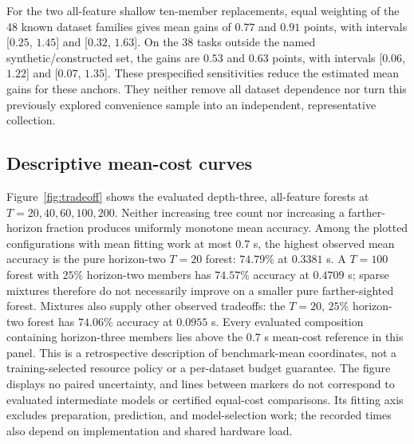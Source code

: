 For the two all-feature shallow ten-member replacements, equal weighting
of the 48 known dataset families gives mean gains of $0.77$ and $0.91$
points, with intervals [$0.25$, $1.45$] and [$0.32$, $1.63$]. On the
38 tasks outside the named synthetic/constructed set, the gains are
$0.53$ and $0.63$ points, with intervals [$0.06$, $1.22$] and
[$0.07$, $1.35$]. These prespecified sensitivities reduce the estimated
mean gains for these anchors. They neither remove all dataset dependence
nor turn this previously explored convenience sample into an independent,
representative collection.

\subsection{Descriptive mean-cost curves}
Figure~\ref{fig:tradeoff} shows the evaluated depth-three, all-feature
forests at $T=20,40,60,100,200$. Neither increasing tree count nor
increasing a farther-horizon fraction produces uniformly monotone mean
accuracy. Among the plotted configurations with mean fitting work at
most $0.7$ s, the highest observed mean accuracy is the pure horizon-two
$T=20$ forest: $74.79\%$ at $0.3381$ s. A $T=100$ forest with
$25\%$ horizon-two members has $74.57\%$ accuracy at $0.4709$ s;
sparse mixtures therefore do not necessarily improve on a smaller pure
farther-sighted forest. Mixtures also supply other observed tradeoffs:
the $T=20$, $25\%$ horizon-two forest has $74.06\%$ accuracy at
$0.0955$ s. Every evaluated composition containing horizon-three
members lies above the $0.7$ s mean-cost reference in this panel.
This is a retrospective description of benchmark-mean coordinates,
not a training-selected resource policy or a per-dataset budget guarantee.
The figure displays no paired uncertainty, and lines between markers
do not correspond to evaluated intermediate models or certified
equal-cost comparisons. Its fitting axis excludes preparation,
prediction, and model-selection work; the recorded times also depend on
implementation and shared hardware load.
